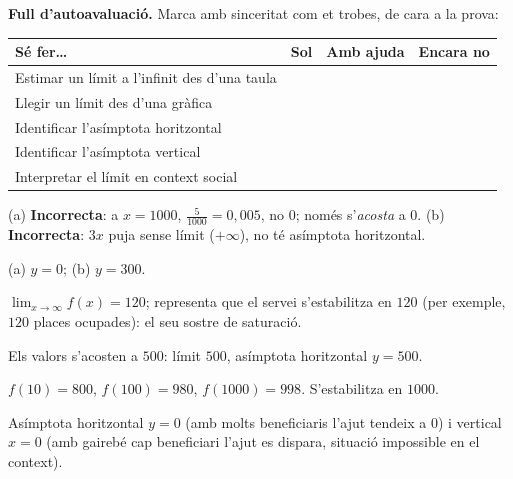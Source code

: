 \begin{idea}
\textbf{Full d'autoavaluació.} Marca amb sinceritat com et trobes, de cara a la prova:
\begin{center}
\renewcommand{\arraystretch}{1.4}
\begin{tabular}{p{8.4cm} c c c}
\toprule
\textbf{Sé fer\dots} & \textbf{Sol} & \textbf{Amb ajuda} & \textbf{Encara no} \\
\midrule
Estimar un límit a l'infinit des d'una taula & & & \\
Llegir un límit des d'una gràfica & & & \\
Identificar l'asímptota horitzontal & & & \\
Identificar l'asímptota vertical & & & \\
Interpretar el límit en context social & & & \\
\bottomrule
\end{tabular}
\end{center}
\end{idea}

\begin{solucions}
\begin{sollist}
  \item (a) \textbf{Incorrecta}: a $x=1000$, $\frac{5}{1000}=0,005$, no $0$; només
        s'\emph{acosta} a $0$. \quad (b) \textbf{Incorrecta}: $3x$ puja sense límit
        ($+\infty$), no té asímptota horitzontal.
  \item (a) $y=0$; \quad (b) $y=300$.
  \item $\lim_{x\to\infty}f(x)=120$; representa que el servei s'estabilitza en $120$
        (per exemple, $120$ places ocupades): el seu sostre de saturació.
  \item Els valors s'acosten a $500$: límit $500$, asímptota horitzontal $y=500$.
  \item $f(10)=800$, $f(100)=980$, $f(1000)=998$. S'estabilitza en $1000$.
  \item Asímptota horitzontal $y=0$ (amb molts beneficiaris l'ajut tendeix a $0$) i
        vertical $x=0$ (amb gairebé cap beneficiari l'ajut es dispara, situació
        impossible en el context).
\end{sollist}
\end{solucions}

